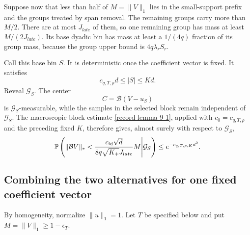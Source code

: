 \documentclass[11pt]{article}
\numberwithin{equation}{section}
\theoremstyle{definition}
\theoremstyle{remark}
\newcommand{\Pp}{\mathbb P}
\newcommand{\1}{\boldsymbol 1}
\begin{document}
\begin{aiblock}
Suppose now that less than half of $M=\|V\|_1$ lies in
the small-support prefix and the groups treated by span
removal. The remaining groups carry more than $M/2$.
There are at most $J_{late}$ of them, so one remaining
group has mass at least $M/(2J_{late})$. Its base dyadic
bin has mass at least a $1/(4q)$ fraction of its group
mass, because the group upper bound is $4q\lambda_rS_r$.

Call this base bin $S$. It is deterministic once the
coefficient vector is fixed. It satisfies
\[
  c_{q,T,\rho}d\le|S|\le Kd.
\]
Reveal $\mathcal{G}_S$. The center
\[
  C=\mathcal{B}(V-u_S)
\]
is $\mathcal{G}_S$-measurable, while the samples in the
selected block remain independent of $\mathcal{G}_S$.
The macroscopic-block estimate \cref{record-lemma-9-1},
applied with $c_0=c_{q,T,\rho}$ and the preceding fixed
$K$, therefore gives, almost surely with respect to
$\mathcal{G}_S$,
\[
  \Pp\left(\|\mathcal{B}V\|_*<\frac{c_{\rm ld}\sqrt d}
  {8q\sqrt{K_+}J_{late}}M\middle|\mathcal{G}_S\right)
  \le e^{-c_{q,T,\rho,K}d^2}.
\]

\subsection{Combining the two alternatives for one fixed
  coefficient vector}\label{fixed-vector-combination}

By homogeneity, normalize $\|u\|_1=1$. Let $T$ be
specified below and put $M=\|V\|_1\ge1-\epsilon_T$.


\end{aiblock}
\end{document}
